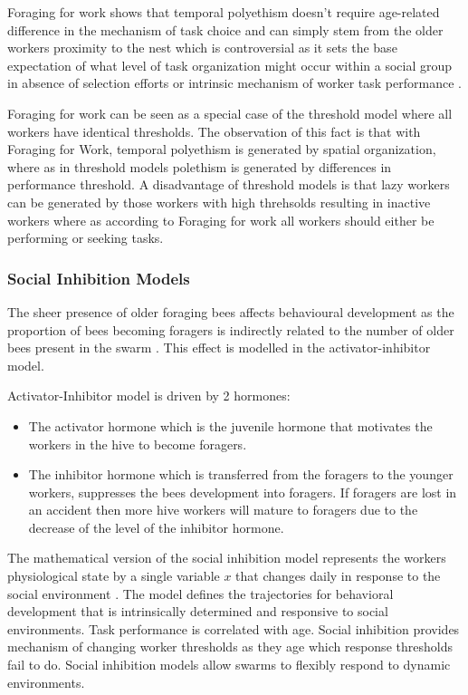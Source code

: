 Foraging for work shows that temporal polyethism doesn't require age-related difference in the mechanism of task choice and can simply stem from the older workers proximity to the nest which is controversial as it sets the base expectation of what level of task organization might occur within a social group in absence of selection efforts or intrinsic mechanism of worker task performance \cite{franks1994foraging}.

Foraging for work can be seen as a special case of the threshold model where all workers have identical thresholds. The observation of this fact is that with Foraging for Work, temporal polyethism is generated by spatial organization, where as in threshold models polethism is generated by differences in performance threshold. A disadvantage of threshold models is that lazy workers can be generated by those workers with high threhsolds resulting in inactive workers where as according to Foraging for work all workers should either be performing or seeking tasks.

\subsubsection{Social Inhibition Models}

The sheer presence of older foraging bees affects behavioural development as the proportion of bees becoming foragers is indirectly related to the number of older bees present in the swarm . This effect is modelled in the activator-inhibitor model.

Activator-Inhibitor model is driven by 2 hormones:
\begin{itemize}
	\item The activator hormone which is the juvenile hormone that motivates the workers in the hive to become foragers.
	\item The inhibitor hormone which is transferred from the foragers to the younger workers, suppresses the bees development into foragers. If foragers are lost in an accident then more hive workers will mature to foragers due to the decrease of the level of the inhibitor hormone.
\end{itemize}

The mathematical version of the social inhibition model represents the workers physiological state by a single variable $x$ that changes daily in response to the social environment \cite{beshers2001social}. The model defines the trajectories for behavioral development that is intrinsically determined and responsive to social environments. Task performance is correlated with age. Social inhibition provides mechanism of changing worker thresholds as they age which response thresholds fail to do. Social inhibition models allow swarms to flexibly respond to dynamic environments. %

